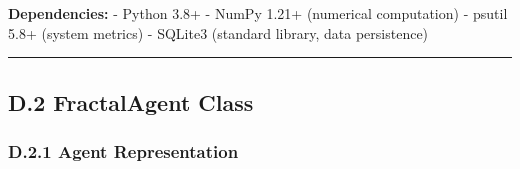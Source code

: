 \documentclass[
]{article}
\begin{document}
\textbf{Dependencies:} - Python 3.8+ - NumPy 1.21+ (numerical
computation) - psutil 5.8+ (system metrics) - SQLite3 (standard library,
data persistence)

\begin{center}\rule{0.5\linewidth}{0.5pt}\end{center}

\subsection{D.2 FractalAgent Class}\label{d.2-fractalagent-class}

\subsubsection{D.2.1 Agent
Representation}\label{d.2.1-agent-representation}
\end{document}
